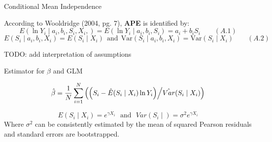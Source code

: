 \documentclass[10pt,ignorenonframetext,]{beamer}
\begin{document}
\begin{frame}{Conditional Mean Independence}
\protect\hypertarget{conditional-mean-independence}{}

According to Wooldridge (2004, pg. 7), \textbf{APE} is identified by:
\[E (\ln Y_i \mid a_i, b_i, S_i, X_i,) = E (\ln Y_i \mid a_i, b_i, S_i) = a_i+b_i S_i \qquad (A.1)\]
\[E(S_i \mid a_i, b_i, X_i) = E(S_i \mid X_i) ~~\text{and}~~ \mathrm{Var}(S_i \mid 
a_i, b_i, X_i) = \mathrm{Var} (S_i \mid X_i) \qquad (A.2)\]

TODO: add interpretation of assumptions

\end{frame}

\begin{frame}{Estimator for \(\beta\) and GLM}
\protect\hypertarget{estimator-for-beta-and-glm}{}

\[
\hat \beta = \frac{1}{N} \sum_{i=1}^N \left( \left( S_i - \hat E (S_i \mid X_i) \ln Y_i \right) \middle/
\hat{Var}(S_i \mid X_i)\right)
\]

\[E(S_i \mid X_i ) = e^{\gamma X_i}  ~~~\text{and}~~~ Var(S_i \mid ) = \sigma^2e^{\gamma X_i}
\] Where \(\sigma^2\) can be consistently estimated by the mean of
squared Pearson residuals and standard errors are bootstrapped.

\end{frame}
\end{document}
